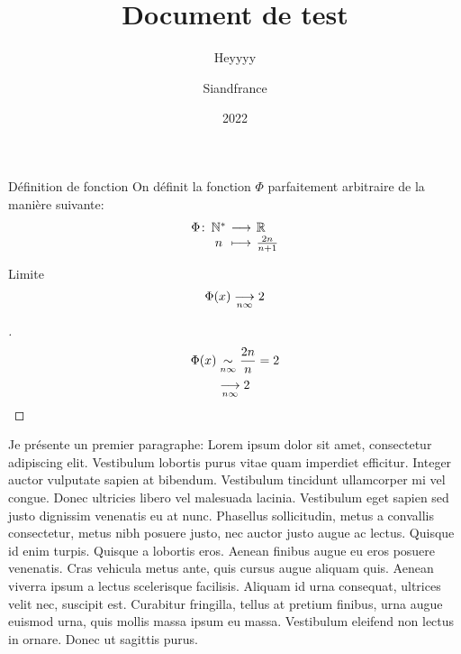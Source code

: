 \documentclass[11pt,compact]{lecture}
\title{Document de test}
\subtitle{Heyyyy}
\author{Siandfrance}
\date{2022}
\begin{document}
\maketitlepage




\begin{definition}[label=deffunc]{Définition de fonction}
    On définit la fonction $\Phi$ parfaitement arbitraire de la manière suivante:
    $$ \function{\Phi}{\N^*}{\R}{n}{ \frac{2n}{n+1} } $$
\end{definition}


\begin{property}[label=philimit]{Limite}
    $$ \Phi(x) \limit{}{n \infty} 2 $$
\end{property}


\begin{proof}[]{}
    \[
        \begin{split}
            \Phi(x) &\fequiv{}{n\infty} \frac{2n}{n} = 2 \\
                    &\limit{}{n\infty} 2
        \end{split}
    \]
\end{proof}




Je présente un premier paragraphe: Lorem ipsum dolor sit amet, consectetur
adipiscing elit. Vestibulum lobortis purus vitae quam imperdiet efficitur.
Integer auctor vulputate sapien at bibendum. Vestibulum tincidunt ullamcorper mi
vel congue. Donec ultricies libero vel malesuada lacinia. Vestibulum eget sapien
sed justo dignissim venenatis eu at nunc. Phasellus sollicitudin, metus a
convallis consectetur, metus nibh posuere justo, nec auctor justo augue ac
lectus. Quisque id enim turpis. Quisque a lobortis eros. Aenean finibus augue eu
eros posuere venenatis. Cras vehicula metus ante, quis cursus augue aliquam
quis. Aenean viverra ipsum a lectus scelerisque facilisis. Aliquam id urna
consequat, ultrices velit nec, suscipit est. Curabitur fringilla, tellus at
pretium finibus, urna augue euismod urna, quis mollis massa ipsum eu massa.
Vestibulum eleifend non lectus in ornare. Donec ut sagittis purus.
\end{document}
